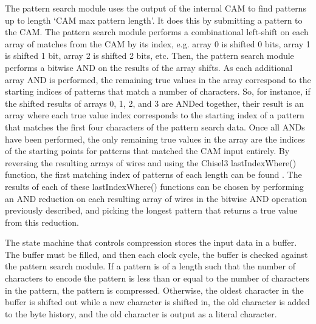 \documentclass[doublespace,nopageskip]{VTthesis}
\begin{document}
The pattern search module uses the output of the internal CAM to find patterns up to length `CAM max pattern length'. It does this by submitting a pattern to the CAM. The pattern search module performs a combinational left-shift on each array of matches from the CAM by its index, e.g. array 0 is shifted 0 bits, array 1 is shifted 1 bit, array 2 is shifted 2 bits, etc. Then, the pattern search module performs a bitwise AND on the results of the array shifts. As each additional array AND is performed, the remaining true values in the array correspond to the starting indices of patterns that match a number of characters. So, for instance, if the shifted results of arrays 0, 1, 2, and 3 are ANDed together, their result is an array where each true value index corresponds to the starting index of a pattern that matches the first four characters of the pattern search data. Once all ANDs have been performed, the only remaining true values in the array are the indices of the starting points for patterns that matched the CAM input entirely. By reversing the resulting arrays of wires and using the Chisel3 lastIndexWhere() function, the first matching index of patterns of each length can be found \cite{chisel3, chisel3documentation}. The results of each of these lastIndexWhere() functions can be chosen by performing an AND reduction on each resulting array of wires in the bitwise AND operation previously described, and picking the longest pattern that returns a true value from this reduction.

The state machine that controls compression stores the input data in a buffer. The buffer must be filled, and then each clock cycle, the buffer is checked against the pattern search module. If a pattern is of a length such that the number of characters to encode the pattern is less than or equal to the number of characters in the pattern, the pattern is compressed. Otherwise, the oldest character in the buffer is shifted out while a new character is shifted in, the old character is added to the byte history, and the old character is output as a literal character.
\end{document}
